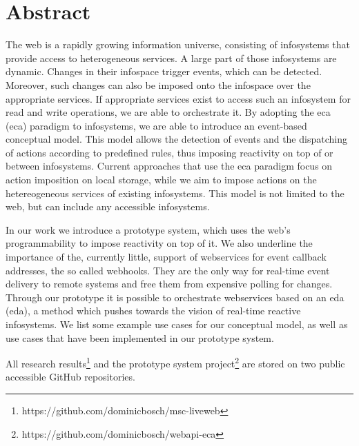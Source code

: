 \chapter*{Abstract}
The \textrm{\gls{web}} is a rapidly growing information universe, consisting of \textrm{\glspl{infosystem}} that provide access to heterogeneous services.
A large part of those \textrm{\glspl{infosystem}} are dynamic.
Changes in their \textrm{\gls{infospace}} trigger events, which can be detected.
Moreover, such changes can also be imposed onto the \textrm{\gls{infospace}} over the appropriate services.
If appropriate services exist to access such an \textrm{\gls{infosystem}} for read and write operations, we are able to orchestrate it.
By adopting the \textrm{\acrlong{eca} (\acrshort{eca})} paradigm to \textrm{\glspl{infosystem}}, we are able to introduce an event-based conceptual model.
This model allows the detection of events and the dispatching of actions according to predefined rules, thus imposing reactivity on top of or between \textrm{\glspl{infosystem}}.
Current approaches that use the \textrm{\acrshort{eca}} paradigm focus on action imposition on local storage, while we aim to impose actions on the hetereogeneous services of existing \textrm{\glspl{infosystem}}.
This model is not limited to the \textrm{\gls{web}}, but can include any accessible \textrm{\glspl{infosystem}}.

In our work we introduce a prototype system, which uses the \textrm{\gls{web}}'s programmability to impose reactivity on top of it.
We also underline the importance of the, currently little, support of \textrm{\glspl{webservice}} for event callback addresses, the so called \textrm{\glspl{webhook}}.
They are the only way for real-time event delivery to remote systems and free them from expensive polling for changes.
Through our prototype it is possible to orchestrate \textrm{\glspl{webservice}} based on an \textrm{\acrlong{eda} (\acrshort{eda})}, a method which pushes towards the vision of real-time reactive \textrm{\glspl{infosystem}}.
We list some example use cases for our conceptual model, as well as use cases that have been implemented in our prototype system.

\vspace{2cm}
All research results\footnote{https://github.com/dominicbosch/msc-liveweb} and the prototype system project\footnote{https://github.com/dominicbosch/webapi-eca} are stored on two public accessible \textrm{GitHub} repositories.